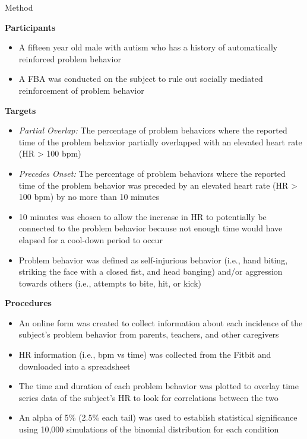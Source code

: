 \documentclass[final]{beamer}
\newlength{\onecolwid}
\begin{document}
\begin{frame}[t]
\begin{columns}[t]
\begin{column}{\onecolwid}
\begin{alertblock}{Method}
	\begin{center}
		\textbf{Participants}
	\end{center}
	\begin{itemize}
		\item A fifteen year old male with autism who has a history of automatically reinforced problem behavior
		\item A FBA was conducted on the subject to rule out socially mediated reinforcement of problem behavior
	\end{itemize}

	\begin{center}
		\textbf{Targets}
	\end{center}
	\begin{itemize}
		\item \textit{Partial Overlap:} The percentage of problem behaviors where the reported time of the problem behavior partially overlapped with an elevated heart rate (HR > 100 bpm)
		\item \textit{Precedes Onset:} The percentage of problem behaviors where the reported time of the problem behavior was preceded by an elevated heart rate (HR > 100 bpm) by no more than 10 minutes
		\item 10 minutes was chosen to allow the increase in HR to potentially be connected to the problem behavior because not enough time would have elapsed for a cool-down period to occur
		\item Problem behavior was defined as self-injurious behavior (i.e., hand biting, striking the face with a closed fist, and head banging) and/or aggression towards others (i.e., attempts to bite, hit, or kick)
	\end{itemize}

	\begin{center}
		\textbf{Procedures}
	\end{center}
	\begin{itemize}
		\item An online form was created to collect information about each incidence of the subject's problem behavior from parents, teachers, and other caregivers
		\item HR information (i.e., bpm vs time) was collected from the Fitbit and downloaded into a spreadsheet
		\item The time and duration of each problem behavior was plotted to overlay time series data of the subject's HR to look for correlations between the two
		\item An alpha of 5\% (2.5\% each tail) was used to establish statistical significance using 10,000  simulations of the binomial distribution for each condition
	\end{itemize}


\end{alertblock}
\end{column}
\end{columns}
\end{frame}
\end{document}
